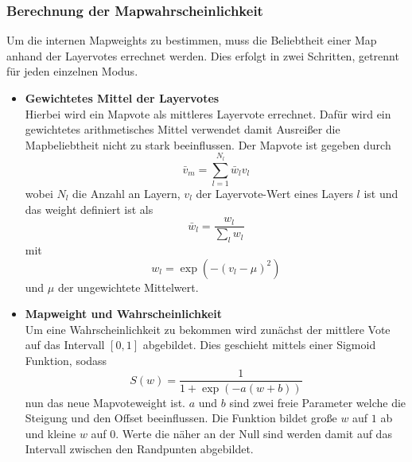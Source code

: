         \subsubsection{Berechnung der Mapwahrscheinlichkeit}
            Um die internen Mapweights zu bestimmen, muss die Beliebtheit einer Map anhand der Layervotes errechnet werden. 
            Dies erfolgt in zwei Schritten, getrennt für jeden einzelnen Modus. 
            \begin{itemize}
                \item \textbf{Gewichtetes Mittel der Layervotes}\\
                Hierbei wird ein Mapvote als mittleres Layervote errechnet. 
                Dafür wird ein gewichtetes arithmetisches Mittel verwendet damit \glqq{}Ausreißer\grqq{} die Mapbeliebtheit nicht zu stark beeinflussen. 
                Der Mapvote ist gegeben durch 
                \begin{equation}
                    \bar{v}_m = \sum_{l=1}^{N_l} \bar{w}_l v_l
                \end{equation}
                wobei $N_l$ die Anzahl an Layern, $v_l$ der Layervote-Wert eines Layers $l$ ist und das weight definiert ist als 
                \begin{equation}
                    \bar{w}_l = \frac{w_l}{\sum_l w_l}
                \end{equation}
                mit 
                \begin{equation}
                    w_l = \exp\left(-\left(v_l-\mu\right)^2\right)
                \end{equation}
                und $\mu$ der ungewichtete Mittelwert. 
                \item \textbf{Mapweight und Wahrscheinlichkeit}\\
                Um eine Wahrscheinlichkeit zu bekommen wird zunächst der mittlere Vote auf das Intervall $[0,1]$ abgebildet.
                Dies geschieht mittels einer Sigmoid Funktion, sodass 
                \begin{equation}
                    S(w) = \frac{1}{1+\exp\left(-a(w+b)\right)}
                \end{equation}
                nun das neue Mapvoteweight  ist. $a$ und $b$ sind zwei freie Parameter welche die Steigung und den Offset beeinflussen. 
                Die Funktion bildet große $w$ auf $1$ ab und kleine $w$ auf $0$. 
                Werte die näher an der Null sind werden damit auf das Intervall zwischen den Randpunten abgebildet.

\end{itemize}
